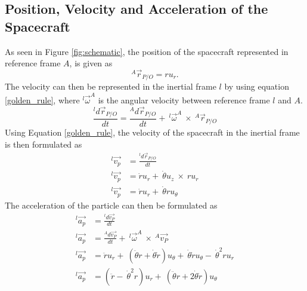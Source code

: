 \documentclass[]{article}
\begin{document}
\subsection{Position, Velocity and Acceleration of the Spacecraft}
As seen in Figure \ref{fig:schematic}, the position of the spacecraft represented in reference frame \(A\), is given as 
\begin{equation} \label{position}
	^A\vec{r}_{P/O} = ru_{r}.
\end{equation}
The velocity can then be represented in the inertial frame \(l\) by using equation \ref{golden_rule}, where \(^l\vec{\omega}^A\) is the angular velocity between reference frame \(l\) and \(A\).
\begin{equation} \label{golden_rule}
	\frac{^ld\vec{r}_{P/O}}{dt} = \frac{^Ad\vec{r}_{P/O}}{dt} +\ ^l\vec{\omega}^A\  \times\  ^A\vec{r}_{P/O} 
\end{equation}
Using Equation \ref{golden_rule}, the velocity of the spacecraft in the inertial frame is then formulated as
\begin{align}
	^l\vec{v_{p}} &= \frac{^ld\vec{r}_{P/O}}{dt} \nonumber\\
	^l\vec{v_{p}} &= \dot{r}u_{r} +\ \dot{\theta}u_{z}\ \times\ ru_{r} \nonumber\\
	^l\vec{v_{p}} &= \dot{r}u_{r} +\ \dot{\theta}ru_{\theta} \label{velocity}
\end{align}
The acceleration of the particle can then be formulated as 
\begin{align}
    ^l\vec{a_{p}} &= \frac{^ld\vec{v_{P}}}{dt} \nonumber\\
	^l\vec{a_{p}} &= \frac{^Ad\vec{v_{P}}}{dt} +\ ^l\vec{\omega}^A\  \times\  ^A\vec{v_{P}} \nonumber\\
	^l\vec{a_{p}} &= \ddot{r}u_{r} +\ (\ddot{\theta}r+\dot{\theta}\dot{r})u_{\theta} +\ \dot{\theta}\dot{r}u_{\theta} -\ \dot{\theta}^2ru_{r} \nonumber\\
	^l\vec{a_{p}} &= (\ddot{r} -\ \dot{\theta}^2r)u_{r} +\ (\ddot{\theta}r+2\dot{\theta}\dot{r})u_{\theta}   \label{acceleration}
\end{align}

\end{document}
